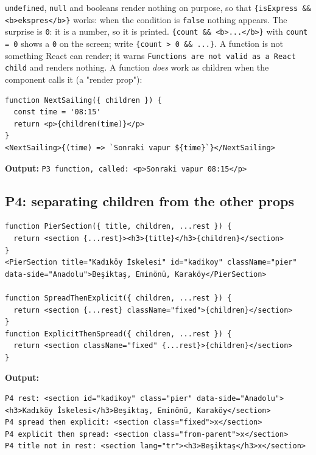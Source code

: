 \documentclass[
  10pt,
]{article}
\begin{document}
\texttt{undefined}, \texttt{null} and booleans render nothing on
purpose, so that \texttt{\{isExpress \&\& <b>ekspres</\allowbreak{}b>\}}
works: when the condition is \texttt{false} nothing appears. The
surprise is \texttt{0}: it is a number, so it is printed.
\texttt{\{count \&\& <b>.\allowbreak{}.\allowbreak{}.\allowbreak{}</\allowbreak{}b>\}}
with \texttt{count =\allowbreak{} 0} shows a \texttt{0} on the screen;
write
\texttt{\{count > 0 \&\& .\allowbreak{}.\allowbreak{}.\allowbreak{}\}}.
A function is not something React can render; it warns
\texttt{Functions are not valid as a React child} and renders nothing. A
function \emph{does} work as children when the component calls it (a
"render prop"):

\begin{verbatim}
function NextSailing({ children }) {
  const time = '08:15'
  return <p>{children(time)}</p>
}
<NextSailing>{(time) => `Sonraki vapur ${time}`}</NextSailing>
\end{verbatim}

\textbf{Output:}
\texttt{P3 function,\allowbreak{} called:\allowbreak{} <p>Sonraki vapur 08:\allowbreak{}15</\allowbreak{}p>}

\hypertarget{p4-separating-children-from-the-other-props}{%
\subsection{P4: separating children from the other
props}\label{p4-separating-children-from-the-other-props}}

\begin{verbatim}
function PierSection({ title, children, ...rest }) {
  return <section {...rest}><h3>{title}</h3>{children}</section>
}
<PierSection title="Kadıköy İskelesi" id="kadikoy" className="pier" data-side="Anadolu">Beşiktaş, Eminönü, Karaköy</PierSection>

function SpreadThenExplicit({ children, ...rest }) {
  return <section {...rest} className="fixed">{children}</section>
}
function ExplicitThenSpread({ children, ...rest }) {
  return <section className="fixed" {...rest}>{children}</section>
}
\end{verbatim}

\textbf{Output:}

\begin{verbatim}
P4 rest: <section id="kadikoy" class="pier" data-side="Anadolu"><h3>Kadıköy İskelesi</h3>Beşiktaş, Eminönü, Karaköy</section>
P4 spread then explicit: <section class="fixed">x</section>
P4 explicit then spread: <section class="from-parent">x</section>
P4 title not in rest: <section lang="tr"><h3>Beşiktaş</h3>x</section>
\end{verbatim}
\end{document}
